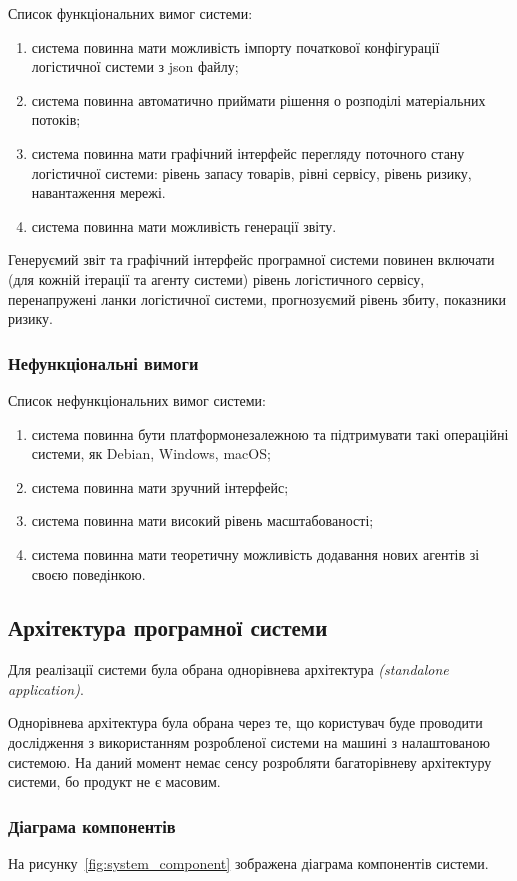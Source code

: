 Список функціональних вимог системи:
\begin{enumerate}[label={\arabic*)}]
	\item система повинна мати можливість імпорту початкової конфігурації логістичної системи з \acrshort{json} файлу;
	\item система повинна автоматично приймати рішення о розподілі матеріальних потоків;
	\item система повинна мати графічний інтерфейс перегляду поточного стану логістичної системи: рівень запасу товарів, рівні сервісу, рівень ризику, навантаження мережі. 
	\item система повинна мати можливість генерації звіту.
\end{enumerate}

Генеруємий звіт та графічний інтерфейс програмної системи повинен включати (для кожній ітерації та агенту системи) рівень логістичного сервісу, перенапружені ланки логістичної системи, прогнозуємий рівень збиту, показники ризику.

\subsubsection{Нефункціональні вимоги}
Список нефункціональних вимог системи:
\begin{enumerate}[label={\arabic*)}]
	\item система повинна бути платформонезалежною та підтримувати такі операційні системи, як Debian, Windows, macOS;
	\item система повинна мати зручний інтерфейс;
	\item система повинна мати високий рівень масштабованості;
	\item система повинна мати теоретичну можливість додавання нових агентів зі своєю поведінкою.
\end{enumerate}

\subsection{Архітектура програмної системи}
Для реалізації системи була обрана однорівнева архітектура \textit{(standalone application)}.

Однорівнева архітектура була обрана через те, що користувач буде проводити дослідження з використанням розробленої системи на машині з налаштованою системою. 
На даний момент немає сенсу розробляти багаторівневу архітектуру системи, бо продукт не є масовим.

\subsubsection{Діаграма компонентів}
На рисунку~\ref{fig:system_component} зображена діаграма компонентів системи.

